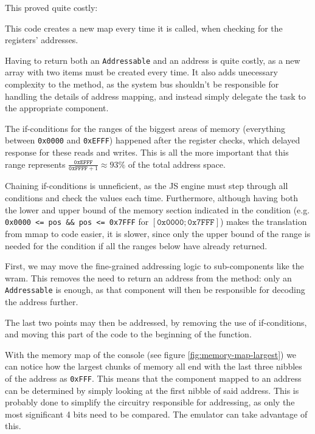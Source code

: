 \documentclass[11pt]{report}
\begin{document}
This proved quite costly:
\begin{compactitem}
    \item This code creates a new map every time it is called, when checking for the registers' addresses.
    \item Having to return both an \texttt{Addressable} and an address is quite costly, as a new array with two items must be created every time. It also adds unecessary complexity to the method, as the system bus shouldn't be responsible for handling the details of address mapping, and instead simply delegate the task to the appropriate component.
    \item The if-conditions for the ranges of the biggest areas of memory (everything between \texttt{0x0000} and \texttt{0xEFFF}) happened after the register checks, which delayed response for these reads and writes. This is all the more important that this range represents $\frac{\texttt{0xEFFF}}{\texttt{0xFFFF}+1} \approx 93\%$ of the total address space.
    \item Chaining if-conditions is unneficient, as the JS engine must step through all conditions and check the values each time. Furthermore, although having both the lower and upper bound of the memory section indicated in the condition (e.g. \texttt{0x0000 <= pos \&\& pos <= 0x7FFF} for $[\texttt{0x0000}; \texttt{0x7FFF}]$) makes the translation from \gls{mmap} to code easier, it is slower, since only the upper bound of the range is needed for the condition if all the ranges below have already returned.
\end{compactitem}

First, we may move the fine-grained addressing logic to sub-components like the \gls{wram}. This removes the need to return an address from the method: only an \texttt{Addressable} is enough, as that component will then be responsible for decoding the address further. 

The last two points may then be addressed, by removing the use of if-conditions, and moving this part of the code to the beginning of the function.

With the memory map of the console (see figure \ref{fig:memory-map-largest}) we can notice how the largest chunks of memory all end with the last three nibbles of the address as \texttt{0xFFF}. This means that the component mapped to an address can be determined by simply looking at the first nibble of said address. This is probably done to simplify the circuitry responsible for addressing, as only the most significant 4 bits need to be compared. The emulator can take advantage of this.
\end{document}
